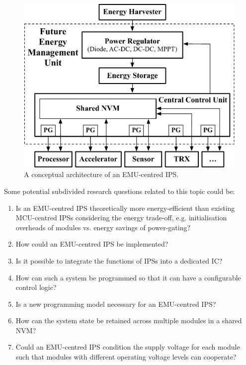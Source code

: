 \begin{figure}
  \centering
  \includegraphics[width=0.8\columnwidth]{ch6_conclusion/figures/EMUIPSarch.pdf}
  \caption{A conceptual architecture of an EMU-centred IPS.}
  \label{fig:emuips}
\end{figure}

Some potential subdivided research questions related to this topic could be:
\begin{enumerate}
    \item Is an EMU-centred IPS theoretically more energy-efficient than existing MCU-centred IPSs considering the energy trade-off, e.g. initialisation overheads of modules vs. energy savings of power-gating?
    \item How could an EMU-centred IPS be implemented?
    \item Is it possible to integrate the functions of IPSs into a dedicated IC?
    \item How can such a system be programmed so that it can have a configurable control logic?
    \item Is a new programming model necessary for an EMU-centred IPS?
    \item How can the system state be retained across multiple modules in a shared NVM?
    \item Could an EMU-centred IPS condition the supply voltage for each module such that modules with different operating voltage levels can cooperate? 
\end{enumerate}



